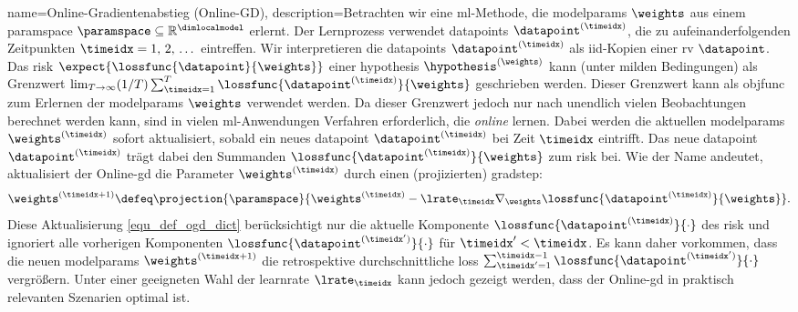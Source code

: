 {{{{
{name={Online-Gradientenabstieg (Online-GD)}, 
	description={Betrachten wir 
		eine \gls{ml}-Methode, die \glspl{modelparam} $\weights$ 
		aus einem \gls{paramspace} $\paramspace \subseteq \mathbb{R}^{\dimlocalmodel}$ erlernt. 
		Der Lernprozess verwendet \glspl{datapoint} $\datapoint^{(\timeidx)}$, 
		die zu aufeinanderfolgenden Zeitpunkten $\timeidx = 1, \,2, \,\dots$ eintreffen. 
		Wir interpretieren die \glspl{datapoint} $\datapoint^{(\timeidx)}$ als \gls{iid}-Kopien 
		einer \gls{rv} $\datapoint$. 
		Das \gls{risk} $\expect\{ \lossfunc{\datapoint}{\weights} \}$ einer 
		\gls{hypothesis} $\hypothesis^{(\weights)}$ kann (unter milden Bedingungen) als Grenzwert 
		$\lim_{T \rightarrow \infty} (1/T)\sum_{\timeidx=1}^{T} \lossfunc{\datapoint^{(\timeidx)}}{\weights}$ 
		geschrieben werden. 
		Dieser Grenzwert kann als \gls{objfunc} zum Erlernen der \glspl{modelparam} $\weights$ verwendet werden. 
		Da dieser Grenzwert jedoch nur nach unendlich vielen Beobachtungen berechnet werden kann, 
		sind in vielen \gls{ml}-Anwendungen Verfahren erforderlich, die \emph{online} lernen. 
		Dabei werden die aktuellen \glspl{modelparam} $\weights^{(\timeidx)}$ sofort aktualisiert, 
		sobald ein neues \gls{datapoint} $\datapoint^{(\timeidx)}$ bei Zeit $\timeidx$ eintrifft. 
		Das neue \gls{datapoint} $\datapoint^{(\timeidx)}$ trägt dabei den Summanden 
		$\lossfunc{\datapoint^{(\timeidx)}}{\weights}$ zum \gls{risk} bei. 
		Wie der Name andeutet, aktualisiert der Online-\gls{gd} die Parameter $\weights^{(\timeidx)}$ 
		durch einen (projizierten) \gls{gradstep}:
		\begin{equation} 
			\label{equ_def_ogd_dict}
 			\weights^{(\timeidx+1)} \defeq \projection{\paramspace}{\weights^{(\timeidx)} - \lrate_{\timeidx} \nabla_{\weights} \lossfunc{\datapoint^{(\timeidx)}}{\weights}}. 
		\end{equation} 
		Diese Aktualisierung \eqref{equ_def_ogd_dict} berücksichtigt nur die aktuelle Komponente 
		$\lossfunc{\datapoint^{(\timeidx)}}{\cdot}$ des \gls{risk} 
		und ignoriert alle vorherigen Komponenten $\lossfunc{\datapoint^{(\timeidx')}}{\cdot}$ für $\timeidx' < \timeidx$. 
		Es kann daher vorkommen, dass die neuen \glspl{modelparam} 
		$\weights^{(\timeidx+1)}$ die retrospektive durchschnittliche \gls{loss} 
		$\sum_{\timeidx'=1}^{\timeidx-1} \lossfunc{\datapoint^{(\timeidx')}}{\cdot}$ vergrößern. 
		Unter einer geeigneten Wahl der \gls{learnrate} $\lrate_{\timeidx}$ 
		kann jedoch gezeigt werden, dass der Online-\gls{gd} in praktisch relevanten Szenarien optimal ist. 
}}}}}}
